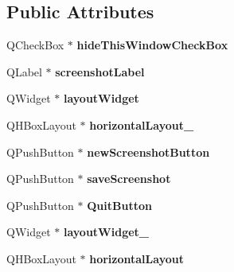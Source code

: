 \subsection*{Public Attributes}
\begin{DoxyCompactItemize}
\item 
\hypertarget{classUi__screenshot_a302c64bae3d7e039369b7ff51a6cfd96}{
QCheckBox $\ast$ {\bfseries hideThisWindowCheckBox}}
\label{classUi__screenshot_a302c64bae3d7e039369b7ff51a6cfd96}

\item 
\hypertarget{classUi__screenshot_aa935229caf3a6831fd0b9e9372882f9e}{
QLabel $\ast$ {\bfseries screenshotLabel}}
\label{classUi__screenshot_aa935229caf3a6831fd0b9e9372882f9e}

\item 
\hypertarget{classUi__screenshot_ab547916593a2a044de05f06d60f00adb}{
QWidget $\ast$ {\bfseries layoutWidget}}
\label{classUi__screenshot_ab547916593a2a044de05f06d60f00adb}

\item 
\hypertarget{classUi__screenshot_a9674ef9297d04ecba53e20df684cd955}{
QHBoxLayout $\ast$ {\bfseries horizontalLayout\_}}
\label{classUi__screenshot_a9674ef9297d04ecba53e20df684cd955}

\item 
\hypertarget{classUi__screenshot_a1968e684c0abd18197e33de63bbf597d}{
QPushButton $\ast$ {\bfseries newScreenshotButton}}
\label{classUi__screenshot_a1968e684c0abd18197e33de63bbf597d}

\item 
\hypertarget{classUi__screenshot_afb9c97a8b8838d3459b2fe7741bce4a3}{
QPushButton $\ast$ {\bfseries saveScreenshot}}
\label{classUi__screenshot_afb9c97a8b8838d3459b2fe7741bce4a3}

\item 
\hypertarget{classUi__screenshot_a0147ccabb2901f567d2524bd495315da}{
QPushButton $\ast$ {\bfseries QuitButton}}
\label{classUi__screenshot_a0147ccabb2901f567d2524bd495315da}

\item 
\hypertarget{classUi__screenshot_a814d1f5ebdeeb7cb2c083253609f71c2}{
QWidget $\ast$ {\bfseries layoutWidget\_}}
\label{classUi__screenshot_a814d1f5ebdeeb7cb2c083253609f71c2}

\item 
\hypertarget{classUi__screenshot_a6e891cbda23b216532845c5ca2b3edb3}{
QHBoxLayout $\ast$ {\bfseries horizontalLayout}}
\label{classUi__screenshot_a6e891cbda23b216532845c5ca2b3edb3}


\end{DoxyCompactItemize}
